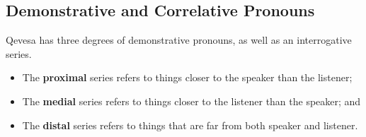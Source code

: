 \documentclass[grammar]{subfiles}
\begin{document}



\subsection{Demonstrative and Correlative Pronouns}
\label{ssec:nm_demonstrative_pronouns}

Qevesa has three degrees of demonstrative pronouns, as well as an interrogative series.

\begin{itemize}
  \item The \textbf{proximal} series refers to things closer to the speaker than the listener;
  \item The \textbf{medial} series refers to things closer to the listener than the speaker; and
  \item The \textbf{distal} series refers to things that are far from both speaker and listener.
\end{itemize}
\end{document}
